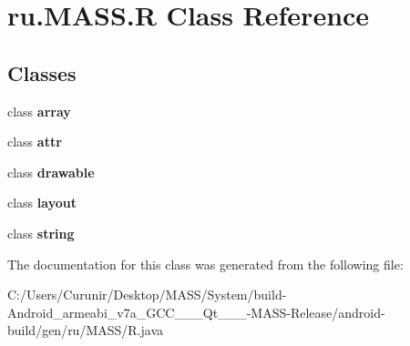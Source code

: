 \hypertarget{classru_1_1_m_a_s_s_1_1_r}{}\section{ru.\+M\+A\+S\+S.\+R Class Reference}
\label{classru_1_1_m_a_s_s_1_1_r}
\subsection*{Classes}
\begin{DoxyCompactItemize}
\item 
class {\bfseries array}
\item 
class {\bfseries attr}
\item 
class {\bfseries drawable}
\item 
class {\bfseries layout}
\item 
class {\bfseries string}
\end{DoxyCompactItemize}


The documentation for this class was generated from the following file\+:\begin{DoxyCompactItemize}
\item 
C\+:/\+Users/\+Curunir/\+Desktop/\+M\+A\+S\+S/\+System/build-\/\+Android\+\_\+armeabi\+\_\+v7a\+\_\+\+G\+C\+C\+\_\+\_\+\_\+\+Qt\+\_\+\_\+\_-\/\+M\+A\+S\+S-\/\+Release/android-\/build/gen/ru/\+M\+A\+S\+S/R.\+java\end{DoxyCompactItemize}
